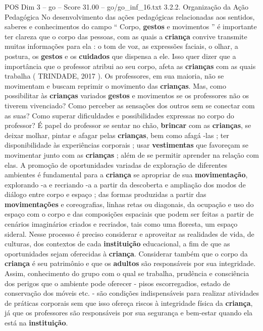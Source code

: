 \begin{textsample}{POS Dim 3 – go – Score 31.00 – go/go\_inf\_16.txt}  \label{ex:f3_pos_048}
3.2.2.
Organização da Ação Pedagógica No desenvolvimento das ações pedagógicas relacionadas aos sentidos, saberes e conhecimentos do campo “ Corpo, \textbf{gestos} e movimentos ” é importante ter clareza que o corpo das pessoas, com as quais a \textbf{criança} convive transmite muitas informações para ela : o tom de voz, as expressões faciais, o olhar, a postura, os \textbf{gestos} e os \textbf{cuidados} que dispensa a ele.
Isso quer dizer que a importância que o professor atribui ao seu corpo, afeta as \textbf{crianças} com as quais trabalha ( TRINDADE, 2017 ).
Os professores, em sua maioria, não se movimentam e buscam reprimir o movimento das \textbf{crianças}.
Mas, como possibilitar às \textbf{crianças} variados \textbf{gestos} e movimentos se os professores não os tiverem vivenciado?
Como perceber as sensações dos outros sem se conectar com as suas?
Como superar dificuldades e possibilidades expressas no corpo do professor?
É papel do professor se sentar no chão, \textbf{brincar} com as \textbf{crianças}, se deixar molhar, pintar e afagar pelas \textbf{crianças}, bem como afagá -las ; ter disponibilidade às experiências corporais ; usar \textbf{vestimentas} que favoreçam se movimentar junto com as \textbf{crianças} ; além de se permitir aprender na relação com elas.
A promoção de oportunidades variadas de exploração de diferentes ambientes é fundamental para a \textbf{criança} se apropriar de sua \textbf{movimentação}, explorando -a e recriando -a a partir da descoberta e ampliação dos modos de diálogo entre corpo e espaço ; das formas produzidas a partir das \textbf{movimentações} e coreografias, linhas retas ou diagonais, da ocupação e uso do espaço com o corpo e das composições espaciais que podem ser feitas a partir de cenários imaginários criados e recriados, tais como uma floresta, um espaço sideral.
Nesse processo é preciso considerar e aproveitar as realidades de vida, de culturas, dos contextos de cada \textbf{instituição} educacional, a fim de que as oportunidades sejam oferecidas à \textbf{criança}.
Considerar também que o corpo da \textbf{criança} é seu patrimônio e que os \textbf{adultos} são responsáveis por sua integridade.
Assim, conhecimento do grupo com o qual se trabalha, prudência e consciência dos perigos que o ambiente pode oferecer - pisos escorregadios, estado de conservação dos móveis etc. - são condições indispensáveis para realizar atividades de práticas corporais sem que isso ofereça riscos à integridade física da \textbf{criança}, já que os professores são responsáveis por sua segurança e bem-estar quando ela está na \textbf{instituição}.

\end{textsample}
